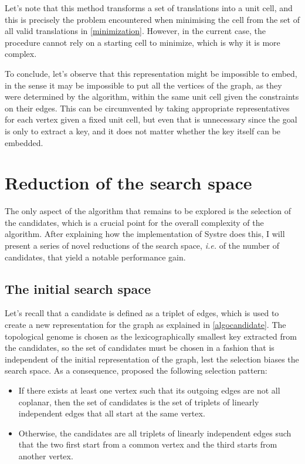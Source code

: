 \documentclass[main.tex]{subfiles}
\begin{document}
Let's note that this method transforms a set of translations into a unit cell, and this is precisely the problem encountered when minimising the cell from the set of all valid translations in \cref{minimization}. However, in the current case, the procedure cannot rely on a starting cell to minimize, which is why it is more complex.

To conclude, let's observe that this representation might be impossible to embed, in the sense it may be impossible to put all the vertices of the graph, as they were determined by the algorithm, within the same unit cell given the constraints on their edges. This can be circumvented by taking appropriate representatives for each vertex given a fixed unit cell, but even that is unnecessary since the goal is only to extract a key, and it does not matter whether the key itself can be embedded.




\section{Reduction of the search space}

\label{searchspacereduction}

The only aspect of the algorithm that remains to be explored is the selection of the candidates, which is a crucial point for the overall complexity of the algorithm. After explaining how the implementation of Systre does this, I will present a series of novel reductions of the search space, \textit{i.e.} of the number of candidates, that yield a notable performance gain.

\subsection{The initial search space}

Let's recall that a candidate is defined as a triplet of edges, which is used to create a new representation for the graph as explained in \cref{algocandidate}. The topological genome is chosen as the lexicographically smallest key extracted from the candidates, so the set of candidates must be chosen in a fashion that is independent of the initial representation of the graph, lest the selection biases the search space. As a consequence, \textcite{Systre} proposed the following selection pattern:
\begin{itemize}[noitemsep]
	\item If there exists at least one vertex such that its outgoing edges are not all coplanar, then the set of candidates is the set of triplets of linearly independent edges that all start at the same vertex.
	\item Otherwise, the candidates are all triplets of linearly independent edges such that the two first start from a common vertex and the third starts from another vertex.
\end{itemize}
\end{document}
